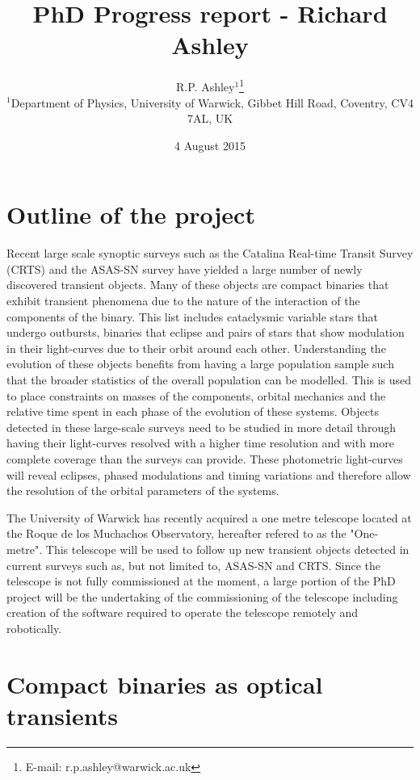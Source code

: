 \documentclass[a4paper,fleqn,usenatbib]{mnras}
\title[Richard Ashley - PhD project]{PhD Progress report - Richard Ashley}
\author[R.P. Ashley et al.]{
R.P. Ashley$^{1}$\thanks{E-mail: r.p.ashley@warwick.ac.uk}\\
$^{1}$Department of Physics, University of Warwick, Gibbet Hill Road, Coventry, CV4 7AL, UK\\
}
\date{4 August 2015}
\begin{document}
\label{firstpage}
\pagerange{\pageref{firstpage}--\pageref{lastpage}}
\maketitle




\section{Outline of the project}
Recent large scale synoptic surveys such as the Catalina Real-time Transit Survey (CRTS)  and the ASAS-SN survey have yielded a large number of newly discovered transient objects. Many of these objects are compact binaries that exhibit transient phenomena due to the nature of the interaction of the components of the binary. This list includes cataclysmic variable stars that undergo outbursts, binaries that eclipse and pairs of stars that show modulation in their light-curves due to their orbit around each other. Understanding the evolution of these objects benefits from having a large population sample such that the broader statistics of the overall population can be modelled. This is used to place constraints on masses of the components, orbital mechanics and the relative time spent in each phase of the evolution of these systems. Objects detected in these large-scale surveys need to be studied in more detail through having their light-curves resolved with a higher time resolution and with more complete coverage than the surveys can provide. These photometric light-curves will reveal eclipses, phased modulations and timing variations and therefore allow the resolution of the orbital parameters of the systems. 

The University of Warwick has recently acquired a one metre telescope located at the Roque de los Muchachos Observatory, hereafter refered to as the "One-metre". This telescope will be used to follow up new transient objects detected in current surveys such as, but not limited to, ASAS-SN and CRTS. Since the telescope is not fully commissioned at the moment, a large portion of the PhD project will be the undertaking of the commissioning of the telescope including creation of the software required to operate the telescope remotely and robotically. 


\section{Compact binaries as optical transients}
\end{document}
